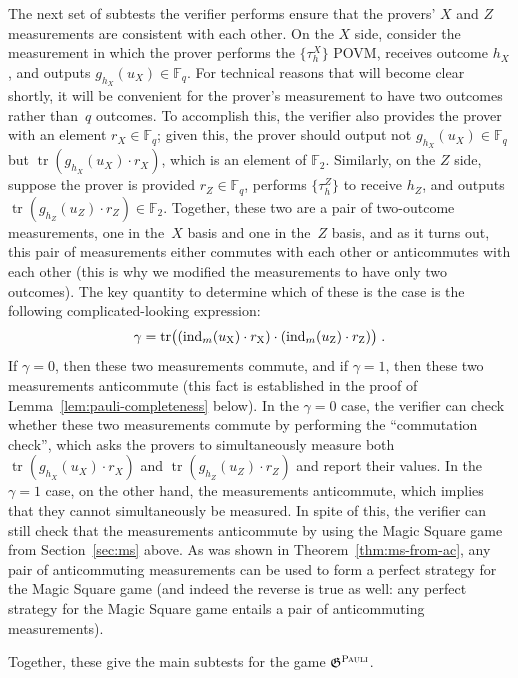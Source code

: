 \documentclass[11pt]{article}
\theoremstyle{definition}
\newcommand{\F}{\ensuremath{\mathbb{F}}}
\newcommand{\ind}{\ensuremath{\mathrm{ind}}}
\DeclareMathOperator{\tr}{tr}
\newcommand{\game}{\mathfrak{G}}
\newcommand{\gamestyle}[1]{\ensuremath{\textsc{#1}}\xspace}
\newcommand{\pauli}{\gamestyle{Pauli}}
\newcommand{\labelstyle}[1]{\ensuremath{\textsc{#1}}\xspace}
\newcommand{\xpt}{\labelstyle{X}}
\newcommand{\zpt}{\labelstyle{Z}}
\begin{document}
The next set of subtests the verifier performs ensure that the provers' $X$ and $Z$ measurements are consistent with each other.
On the $X$ side, consider the measurement in which the prover performs the $\{\tau_h^X\}$ POVM,
receives outcome $h_X$, and outputs $g_{h_X}(u_X) \in \F_q$.
For technical reasons that will become clear shortly,
it will be convenient for the prover's measurement to have two outcomes rather than~$q$ outcomes.
To accomplish this, the verifier also provides the prover with an element $r_X \in \F_q$;
given this, the prover should output not $g_{h_X}(u_X) \in \F_q$ but $\tr(g_{h_X}(u_X) \cdot r_X)$, which is an element of $\F_2$.
Similarly, on the $Z$ side, suppose the prover is provided $r_Z \in \F_q$,
performs $\{\tau_h^Z\}$ to receive $h_Z$, and outputs $\tr(g_{h_Z}(u_Z) \cdot r_Z) \in \F_2$.
Together, these two are a pair of two-outcome measurements, one in the~$X$ basis and one in the~$Z$ basis,
and as it turns out, this pair of measurements either commutes with each other or anticommutes with each other
(this is why we modified the measurements to have only two outcomes).
The key quantity to determine which of these is the case is the following complicated-looking expression:
\begin{equation*}
\gamma = \tr \bigl( (\ind_{m}(u_\xpt) \cdot r_\xpt) \cdot
      (\ind_{m}(u_\zpt) \cdot r_\zpt) \bigr)\;.
\end{equation*}
If $\gamma = 0$, then these two measurements commute, and if $\gamma = 1$, then these two measurements anticommute
(this fact is established in the proof of Lemma~\ref{lem:pauli-completeness} below).
In the $\gamma = 0$ case, the verifier can check whether these two measurements commute by performing the ``commutation check'',
which asks the provers to simultaneously measure both $\tr(g_{h_X}(u_X) \cdot r_X)$ and $\tr(g_{h_Z}(u_Z) \cdot r_Z)$ and report their values.
In the $\gamma = 1$ case, on the other hand, the measurements anticommute, which implies that they cannot simultaneously be measured.
In spite of this, the verifier can still check that the measurements anticommute by using the Magic Square game from Section~\ref{sec:ms} above.
As was shown in Theorem~\ref{thm:ms-from-ac}, any pair of anticommuting measurements
can be used to form a perfect strategy for the Magic Square game
(and indeed the reverse is true as well: any perfect strategy for the Magic Square game entails a pair of anticommuting measurements).

Together, these give the main subtests for the game $\game^\pauli$.
\end{document}
